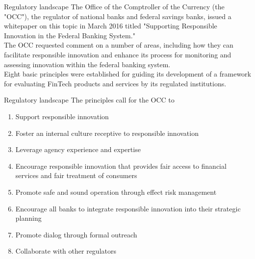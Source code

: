 \documentclass[9pt]{beamer}
\begin{document}

\begin{frame}{Regulatory landscape}
	The Office of the Comptroller of the Currency (the "OCC"), the regulator of national banks and federal savings banks, issued a whitepaper on this topic in March 2016 titled "Supporting Responsible Innovation in the Federal Banking System." \\ \vspace{3mm}
	The OCC requested comment on a number of areas, including how they can facilitate responsible innovation and enhance its process for monitoring and assessing innovation within the federal banking system. \\ \vspace{3mm}
	Eight basic principles were established for guiding its development of a framework for evaluating FinTech products and services by its regulated institutions.
\end{frame}


\begin{frame}{Regulatory landscape}
	The principles call for the OCC to
	\begin{enumerate}
		\item Support responsible innovation
		\item Foster an internal culture receptive to responsible innovation
		\item Leverage agency experience and expertise
		\item Encourage responsible innovation that provides fair access to financial services and fair treatment of consumers
		\item Promote safe and sound operation through effect risk management
		\item Encourage all banks to integrate responsible innovation into their strategic planning
		\item Promote dialog through formal outreach
		\item Collaborate with other regulators
	\end{enumerate}
\end{frame}

\end{document}
